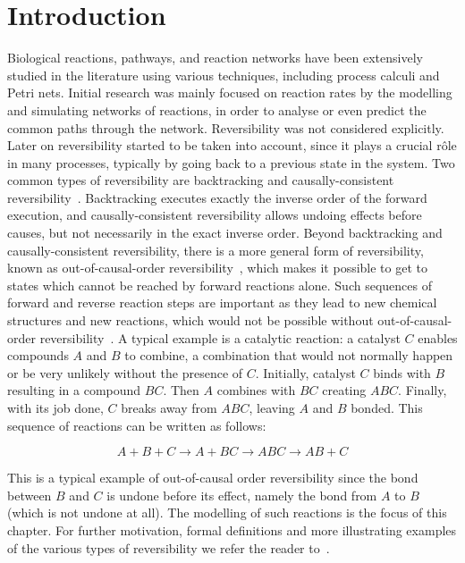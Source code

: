\documentclass[runningheads]{llncs}
\begin{document}
\section{Introduction}

Biological reactions, pathways, and reaction networks have been extensively studied in the literature 
using various  techniques,  including  process  calculi and Petri nets.  Initial research was mainly 
focused  on
reaction rates by the modelling and simulating networks of reactions, in order to
analyse or even predict the common paths through the network.  Reversibility
was not considered explicitly.  Later on
reversibility  started  to  be  taken  into  account,  since  it  plays  a  crucial  r\^ole  in
many processes, typically by going back to a previous state in the system. 
Two common types of reversibility 
are backtracking and causally-consistent reversibility~\cite{danos2004ccsr,Irek2007,LaneseMS10}.
%
Backtracking executes exactly the inverse order of the 
forward execution, and causally-consistent reversibility allows undoing effects before causes, 
but not necessarily in the exact inverse order. 
Beyond backtracking and causally-consistent reversibility, there is a more general form of 
reversibility, known as out-of-causal-order reversibility~\cite{Irek2012}, 
which makes it possible to get to states which cannot be reached by forward reactions alone.  Such sequences
of forward and reverse reaction steps are important as they lead to new chemical
structures and new reactions, which would not be possible without out-of-causal-order
reversibility~\cite{Irek2012}. A typical example is a catalytic reaction: a catalyst $C$ enables compounds 
$A$ and $B$ to combine, a combination that would not normally happen or be very unlikely without the presence 
of $C$. Initially, catalyst $C$ binds with $B$ resulting in a compound $BC$. Then $A$ combines with $BC$
creating $ABC$. Finally, with its job done, $C$ breaks away from $ABC$, leaving $A$ and $B$ bonded. 
This sequence of reactions can be written as follows:

$$ A + B + C \rightarrow A+ BC \rightarrow ABC \rightarrow AB + C$$

\noindent
This is a typical example of out-of-causal order reversibility since the bond between $B$ and $C$
is undone before its effect, namely the bond from $A$ to $B$ (which is not undone at all). 
The modelling of such reactions is the focus of this chapter. For further
motivation, formal definitions and more illustrating examples of the various types of reversibility 
we refer the reader to~\cite{danos2004ccsr,Irek2007,LaneseMS10,Irek2012}.
\end{document}
